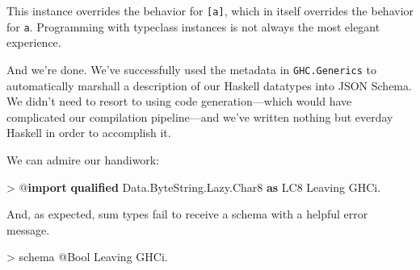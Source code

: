 \documentclass[
  11pt,
]{book}
\newenvironment{Shaded}{}{}
\newcommand{\DataTypeTok}[1]{\textcolor[rgb]{0.56,0.13,0.00}{#1}}
\newcommand{\FunctionTok}[1]{\textcolor[rgb]{0.02,0.16,0.49}{#1}}
\newcommand{\KeywordTok}[1]{\textcolor[rgb]{0.00,0.44,0.13}{\textbf{#1}}}
\newcommand{\NormalTok}[1]{#1}
\newcommand{\OperatorTok}[1]{\textcolor[rgb]{0.40,0.40,0.40}{#1}}
\newcommand{\OtherTok}[1]{\textcolor[rgb]{0.00,0.44,0.13}{#1}}
\theoremstyle{nonumberplain}
\begin{document}
\begin{Shaded}
\end{Shaded}

This instance overrides the behavior for \texttt{{[}a{]}}, which in
itself overrides the behavior for \texttt{a}. Programming with typeclass
instances is not always the most elegant experience.

And we're done. We've successfully used the metadata in
\texttt{GHC.Generics} to automatically marshall a description of our
Haskell datatypes into JSON Schema. We didn't need to resort to using
code generation---which would have complicated our compilation
pipeline---and we've written nothing but everday Haskell in order to
accomplish it.

We can admire our handiwork:

\begin{Shaded}
\begin{Highlighting}[]
\OperatorTok{\textgreater{}} \OperatorTok{@}\KeywordTok{import} \KeywordTok{qualified} \DataTypeTok{Data.ByteString.Lazy.Char8} \KeywordTok{as} \DataTypeTok{LC8}
\DataTypeTok{Leaving} \DataTypeTok{GHCi}\OperatorTok{.}
\end{Highlighting}
\end{Shaded}

And, as expected, sum types fail to receive a schema with a helpful
error message.

\begin{Shaded}
\begin{Highlighting}[]
\OperatorTok{\textgreater{}}\NormalTok{ schema }\OperatorTok{@}\DataTypeTok{Bool}
\DataTypeTok{Leaving} \DataTypeTok{GHCi}\OperatorTok{.}
\end{Highlighting}
\end{Shaded}
\end{document}
